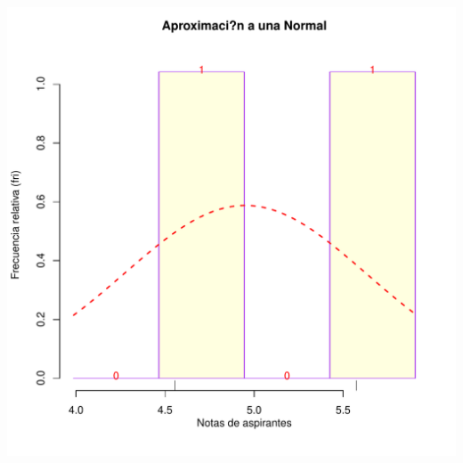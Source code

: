 \documentclass[10pt,a4paper]{article}\usepackage[]{graphicx}\usepackage[]{color}
\makeatletter
\def\maxwidth{ %
  \ifdim\Gin@nat@width>\linewidth
    \linewidth
  \else
    \Gin@nat@width
  \fi
}
\newenvironment{knitrout}{}{} %
\makeatother
\begin{document}
\begin{knitrout}
\includegraphics[width=\maxwidth]{figure/unnamed-chunk-13-1} 

\end{knitrout}
\end{document}

